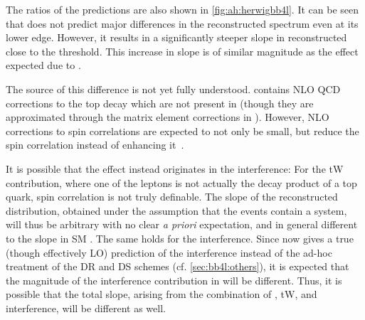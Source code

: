 The ratios of the predictions are also shown in \cref{fig:ah:herwigbb4l}. It can be seen that \bbfourl does not predict major differences in the reconstructed \mtt spectrum even at its lower edge. However, it results in a significantly steeper slope in reconstructed \chel close to the threshold. This increase in slope is of similar magnitude as the effect expected due to \etat. 

The source of this difference is not yet fully understood. \bbfourl contains NLO QCD corrections to the top decay which are not present in \hvq (though they are approximated through the matrix element corrections in \pythia). However, NLO corrections to spin correlations are expected to not only be small, but reduce the spin correlation instead of enhancing it~\cite{Bernreuther:2004jv}. 

It is possible that the effect instead originates in the \tttW interference:
For the tW contribution, where one of the leptons is not actually the decay product of a top quark, \ttbar spin correlation is not truly definable. The slope of the reconstructed \chel distribution, obtained under the assumption that the events contain a \ttbar system, will thus be arbitrary with no clear \textit{a priori} expectation, and in general different to the slope in SM \ttbar. The same holds for the \tttW interference. Since \bbfourl now gives a true (though effectively LO) prediction of the \tttW interference instead of the ad-hoc treatment of the DR and DS schemes (cf. \cref{sec:bb4l:others}), it is expected that the magnitude of the interference contribution in \bbfourl will be different. Thus, it is possible that the total \chel slope, arising from the combination of \ttbar, tW, and \tttW interference, will be different as well.


